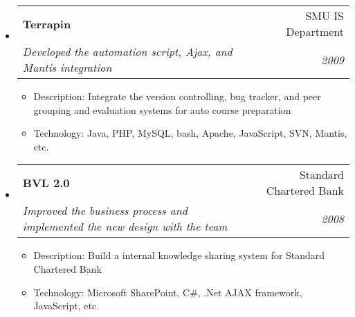 \documentclass[twoside,letterpaper,11pt]{article}
\makeatletter
\newcommand{\resitem}[1]{\item #1 \vspace{-5pt}}
\newcommand{\ressubheading}[4]{
\begin{tabular*}{7in}{l@{\extracolsep{\fill}}r}
		\textbf{#1} & #2 \\
		\textit{#3} & \textit{#4} \\
\end{tabular*}\vspace{-6pt}}
\makeatother
\begin{document}
\begin{itemize}
\item 
	\ressubheading{Terrapin}{SMU IS Department}{Developed the automation script, Ajax, and Mantis integration
}{2009}
	\begin{itemize}
		\resitem{Description: Integrate the version controlling, bug tracker, and peer grouping and evaluation systems for auto course preparation}
		\resitem{Technology: Java, PHP, MySQL, bash, Apache, JavaScript, SVN, Mantis, etc.}
	\end{itemize}
\newpage
{}

\item
	\ressubheading{BVL 2.0}{Standard Chartered Bank}{Improved the business process and implemented the new design with the team}{2008}
	\begin{itemize}
		\resitem{Description: Build a internal knowledge sharing system for Standard Chartered Bank}
		\resitem{Technology: Microsoft SharePoint, C\#, .Net AJAX framework, JavaScript, etc.}
	\end{itemize}

\end{itemize}
\end{document}
